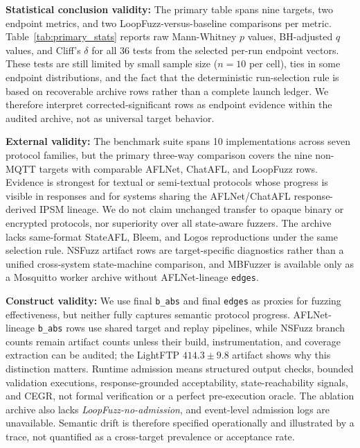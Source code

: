 \documentclass[final,5p,times,number]{elsarticle}
\begin{document}
\textbf{Statistical conclusion validity:} The primary table spans nine targets, two endpoint metrics, and two LoopFuzz-versus-baseline comparisons per metric. Table~\ref{tab:primary_stats} reports raw Mann-Whitney $p$ values, BH-adjusted $q$ values, and Cliff's $\delta$ for all 36 tests from the selected per-run endpoint vectors. These tests are still limited by small sample size ($n=10$ per cell), ties in some endpoint distributions, and the fact that the deterministic run-selection rule is based on recoverable archive rows rather than a complete launch ledger. We therefore interpret corrected-significant rows as endpoint evidence within the audited archive, not as universal target behavior.

\textbf{External validity:} The benchmark suite spans 10 implementations across seven protocol families, but the primary three-way comparison covers the nine non-MQTT targets with comparable AFLNet, ChatAFL, and LoopFuzz rows. Evidence is strongest for textual or semi-textual protocols whose progress is visible in responses and for systems sharing the AFLNet/ChatAFL response-derived IPSM lineage. We do not claim unchanged transfer to opaque binary or encrypted protocols, nor superiority over all state-aware fuzzers. The archive lacks same-format StateAFL, Bleem, and Logos reproductions under the same selection rule. NSFuzz artifact rows are target-specific diagnostics rather than a unified cross-system state-machine comparison, and MBFuzzer is available only as a Mosquitto worker archive without AFLNet-lineage \texttt{edges}.

\textbf{Construct validity:} We use final \texttt{b\_abs} and final \texttt{edges} as proxies for fuzzing effectiveness, but neither fully captures semantic protocol progress. AFLNet-lineage \texttt{b\_abs} rows use shared target and replay pipelines, while NSFuzz branch counts remain artifact counts unless their build, instrumentation, and coverage extraction can be audited; the LightFTP $414.3{\pm}9.8$ artifact shows why this distinction matters. Runtime admission means structured output checks, bounded validation executions, response-grounded acceptability, state-reachability signals, and CEGR, not formal verification or a perfect pre-execution oracle. The ablation archive also lacks \emph{LoopFuzz-no-admission}, and event-level admission logs are unavailable. Semantic drift is therefore specified operationally and illustrated by a trace, not quantified as a cross-target prevalence or acceptance rate.
\end{document}
